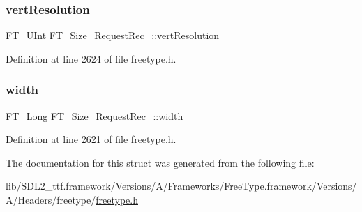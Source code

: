 \subsubsection{\texorpdfstring{vertResolution}{vertResolution}}
{\footnotesize\ttfamily \mbox{\hyperlink{fttypes_8h_abcb8db4dbf35d2b55a9e8c7b0926dc52}{F\+T\+\_\+\+U\+Int}} F\+T\+\_\+\+Size\+\_\+\+Request\+Rec\+\_\+\+::vert\+Resolution}



Definition at line 2624 of file freetype.\+h.

\mbox{\label{struct_f_t___size___request_rec___a7b044d36af318b053d5e3939eb0d5039}} 
\subsubsection{\texorpdfstring{width}{width}}
{\footnotesize\ttfamily \mbox{\hyperlink{fttypes_8h_a7fa72a1f0e79fb1860c5965789024d6f}{F\+T\+\_\+\+Long}} F\+T\+\_\+\+Size\+\_\+\+Request\+Rec\+\_\+\+::width}



Definition at line 2621 of file freetype.\+h.



The documentation for this struct was generated from the following file\+:\begin{DoxyCompactItemize}
\item 
lib/\+S\+D\+L2\+\_\+ttf.\+framework/\+Versions/\+A/\+Frameworks/\+Free\+Type.\+framework/\+Versions/\+A/\+Headers/freetype/\mbox{\hyperlink{freetype_8h}{freetype.\+h}}\end{DoxyCompactItemize}
